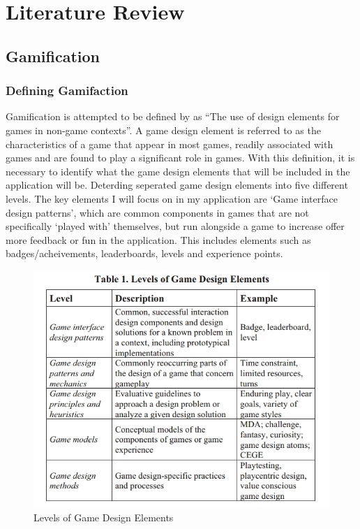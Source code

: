 \chapter{Literature Review}
\label{chap:litReview}

\section{Gamification}


\subsection{Defining Gamifaction}
Gamification is attempted to be defined by \cite{Deterding:2011:GDE:2181037.2181040} as ``The use of design elements for games in non-game contexts''. 
A game design element is referred to as the characteristics of a game that appear in most games, readily associated with games and are found to play a significant role in games.
With this definition, it is necessary to identify what the game design elements that will be included in the application will be. 
Deterding seperated game design elements into five different levels. 
The key elements I will focus on in my application are `Game interface design patterns', which are common components in games that are not specifically `played with' themselves, but run alongside a game to increase offer more feedback or fun in the application.
This includes elements such as badges/acheivements, leaderboards, levels and experience points.

\begin{figure}[h]
	\centering
	\includegraphics[scale=0.45]{images/DeterdingsLevelsOfGameDesignElements.jpg}
	\caption{Levels of Game Design Elements}
	\label{fig:GameDesignElements}
\end{figure}

